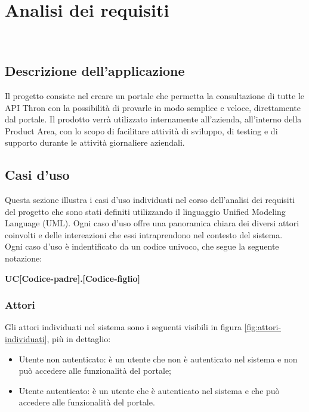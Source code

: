 \chapter{Analisi dei requisiti}
\label{cap:analisi-requisiti}

\\
 
\section{Descrizione dell'applicazione}

Il progetto consiste nel creare un portale che permetta la consultazione di tutte le API Thron con la possibilità di provarle in modo semplice e veloce, direttamente dal portale.
Il prodotto verrà utilizzato internamente all'azienda, all'interno della Product Area, con lo scopo di facilitare attività di sviluppo, di testing e di supporto durante le attività giornaliere aziendali.

\section{Casi d'uso}\label{sec:usecase}
Questa sezione illustra i casi d'uso individuati nel corso dell'analisi dei requisiti del progetto che sono stati definiti utilizzando il linguaggio Unified Modeling Language (UML).
Ogni caso d'uso offre una panoramica chiara dei diversi attori coinvolti e delle intereazioni che essi intraprendono nel contesto del sistema.\\

Ogni caso d'uso è indentificato da un codice univoco, che segue la seguente notazione:
\begin{center}
    \textbf{UC[Codice-padre].[Codice-figlio]}
  \end{center}


\subsection{Attori}
Gli attori individuati nel sistema sono i seguenti visibili in figura \ref{fig:attori-individuati}, più in dettaglio:
\begin{itemize}
    \item Utente non autenticato: è un utente che non è autenticato nel sistema e non può accedere alle funzionalità del portale;
    \item Utente autenticato: è un utente che è autenticato nel sistema e che può accedere alle funzionalità del portale.
\end{itemize}

